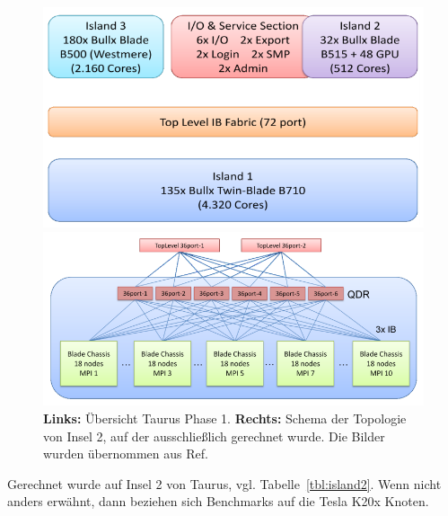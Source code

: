 \begin{figure}[H]
	\centering
	\begin{minipage}{0.5\linewidth}
		\includegraphics[width=\linewidth]{taurusphase1}
	\end{minipage}\begin{minipage}{0.5\linewidth}
		\includegraphics[width=\linewidth]{taurusphase1island1interconnects}
	\end{minipage}
	\caption{\textbf{Links:} Übersicht Taurus Phase 1. \textbf{Rechts:} Schema der Topologie von Insel 2, auf der ausschließlich gerechnet wurde. Die Bilder wurden übernommen aus Ref.\cite{taurusnutzerschulung}}
	\label{fig:taurusphase1}
\end{figure}

Gerechnet wurde auf Insel 2 von Taurus, vgl. Tabelle~\ref{tbl:island2}. Wenn nicht anders erwähnt, dann beziehen sich Benchmarks auf die Tesla K20x Knoten.

